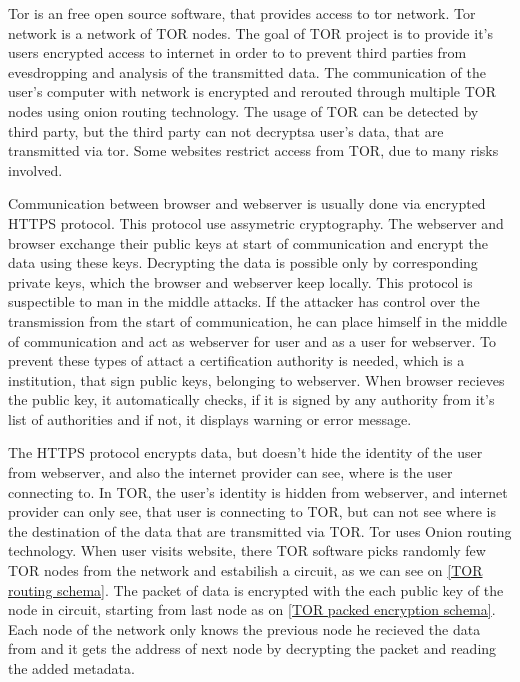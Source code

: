 \documentclass[
  digital, %
  table,   %
  lof,     %
  lot,     %
  oneside
]{fithesis3}
\begin{document}
Tor is an free open source software, that provides access to tor network. Tor network is a network of TOR nodes.
The goal of TOR project is to provide it's users encrypted access to internet in order to to prevent third parties
from evesdropping and analysis of the transmitted data.
The communication of the user's computer with network is encrypted and rerouted through multiple TOR nodes using onion routing technology.
The usage of TOR can be detected by third party, but the third party can not decryptsa user's data, that are transmitted via tor.
Some websites restrict access from TOR, due to many risks involved.

Communication between browser and webserver is usually done via encrypted HTTPS protocol.
This protocol use assymetric cryptography. The webserver and browser exchange their public keys at start of communication
and encrypt the data using these keys. Decrypting the data is possible only by corresponding private keys,
which the browser and webserver keep locally. This protocol is suspectible to man in the middle attacks.
If the attacker has control over the transmission from the start of communication, he can place himself in the middle
 of communication and act as webserver for user and as a user for webserver. To prevent these types of attact
 a certification authority is needed, which is a institution, that sign public keys, belonging to webserver.
 When browser recieves the public key, it automatically checks, if it is signed by any authority from it's list of authorities
 and if not, it displays warning or error message.
 
The HTTPS protocol encrypts data, but doesn't hide the identity of the user from webserver,
 and also the internet provider can see, where is the user connecting to.
 In TOR, the user's identity is hidden from webserver, and internet provider can only see, that user is connecting to TOR,
 but can not see where is the destination of the data that are transmitted via TOR.
 Tor uses Onion routing technology. When user visits website, there TOR software picks randomly few TOR nodes from the network
 and estabilish a circuit, as we can see on \ref{TOR routing schema}. 
 The packet of data is encrypted with the each public key of the node in circuit, starting from last node as on \ref{TOR packed encryption schema}.
 Each node of the network only knows the previous node he recieved the data from and it gets the address 
 of next node by decrypting the packet and reading the added metadata.
 
\end{document}
